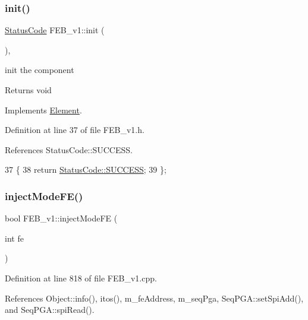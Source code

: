 \subsubsection{\texorpdfstring{init()}{init()}}
{\footnotesize\ttfamily \hyperlink{classStatusCode}{Status\+Code} F\+E\+B\+\_\+v1\+::init (\begin{DoxyParamCaption}{ }\end{DoxyParamCaption})\hspace{0.3cm}{\ttfamily [inline]}, {\ttfamily [virtual]}}

init the component

\begin{DoxyReturn}{Returns}
void 
\end{DoxyReturn}


Implements \hyperlink{classElement_af42754b5cabc198869222725218d695c}{Element}.



Definition at line 37 of file F\+E\+B\+\_\+v1.\+h.



References Status\+Code\+::\+S\+U\+C\+C\+E\+SS.


\begin{DoxyCode}
37                     \{
38     \textcolor{keywordflow}{return} \hyperlink{classStatusCode_a6f565cbeadc76d14c72f047e5e85eb4badd0da38d3ba0d922efd1f4619bc37ad8}{StatusCode::SUCCESS};
39   \};
\end{DoxyCode}
\mbox{\label{classFEB__v1_adad5a9a1dc8f650a59e6edb310451cab}} 
\subsubsection{\texorpdfstring{inject\+Mode\+F\+E()}{injectModeFE()}}
{\footnotesize\ttfamily bool F\+E\+B\+\_\+v1\+::inject\+Mode\+FE (\begin{DoxyParamCaption}\item[{int}]{fe }\end{DoxyParamCaption})}



Definition at line 818 of file F\+E\+B\+\_\+v1.\+cpp.



References Object\+::info(), itos(), m\+\_\+fe\+Address, m\+\_\+seq\+Pga, Seq\+P\+G\+A\+::set\+Spi\+Add(), and Seq\+P\+G\+A\+::spi\+Read().



